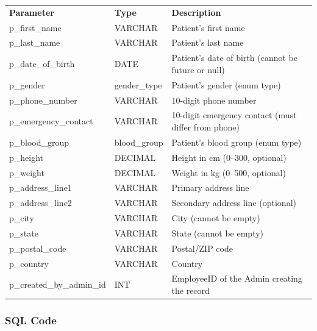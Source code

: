 \documentclass{article}
\newcommand{\theadcell}{\color{white}\bfseries}
\begin{document}
\begin{center}
\begin{tabular}{L{4.5cm} L{2.5cm} L{6.5cm}}
   \theadcell Parameter & \theadcell Type & \theadcell Description \\
   p\_first\_name & VARCHAR & Patient's first name \\
   p\_last\_name & VARCHAR & Patient's last name \\
   p\_date\_of\_birth & DATE & Patient's date of birth (cannot be future or null) \\
   p\_gender & gender\_type & Patient's gender (enum type) \\
   p\_phone\_number & VARCHAR & 10-digit phone number \\
   p\_emergency\_contact & VARCHAR & 10-digit emergency contact (must differ from phone) \\
   p\_blood\_group & blood\_group & Patient's blood group (enum type) \\
   p\_height & DECIMAL & Height in cm (0--300, optional) \\
   p\_weight & DECIMAL & Weight in kg (0--500, optional) \\
   p\_address\_line1 & VARCHAR & Primary address line \\
   p\_address\_line2 & VARCHAR & Secondary address line (optional) \\
   p\_city & VARCHAR & City (cannot be empty) \\
   p\_state & VARCHAR & State (cannot be empty) \\
   p\_postal\_code & VARCHAR & Postal/ZIP code \\
   p\_country & VARCHAR & Country \\
   p\_created\_by\_admin\_id & INT & EmployeeID of the Admin creating the record \\
\end{tabular}
\end{center}

\subsubsection{SQL Code}
\end{document}
